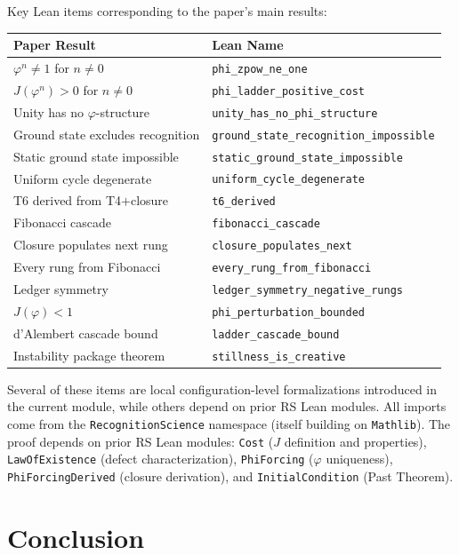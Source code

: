 \documentclass[11pt,a4paper]{article}
\newcommand{\Jcost}{J}
\newcommand{\phirs}{\varphi}
\begin{document}
Key Lean items corresponding to the paper's main results:
\begin{center}
\begin{tabular}{@{}ll@{}}
\toprule
\textbf{Paper Result} & \textbf{Lean Name} \\
\midrule
$\phirs^n\neq 1$ for $n\neq 0$ & \texttt{phi\_zpow\_ne\_one} \\
$\Jcost(\phirs^n)>0$ for $n\neq 0$ & \texttt{phi\_ladder\_positive\_cost} \\
Unity has no $\phirs$-structure & \texttt{unity\_has\_no\_phi\_structure} \\
Ground state excludes recognition & \texttt{ground\_state\_recognition\_impossible} \\
Static ground state impossible & \texttt{static\_ground\_state\_impossible} \\
Uniform cycle degenerate & \texttt{uniform\_cycle\_degenerate} \\
T6 derived from T4$+$closure & \texttt{t6\_derived} \\
Fibonacci cascade & \texttt{fibonacci\_cascade} \\
Closure populates next rung & \texttt{closure\_populates\_next} \\
Every rung from Fibonacci & \texttt{every\_rung\_from\_fibonacci} \\
Ledger symmetry & \texttt{ledger\_symmetry\_negative\_rungs} \\
$\Jcost(\phirs)<1$ & \texttt{phi\_perturbation\_bounded} \\
d'Alembert cascade bound & \texttt{ladder\_cascade\_bound} \\
Instability package theorem & \texttt{stillness\_is\_creative} \\
\bottomrule
\end{tabular}
\end{center}

Several of these items are local configuration-level formalizations introduced in the current module, while others depend on prior RS Lean modules.  All imports come from the \texttt{RecognitionScience} namespace (itself building on \texttt{Mathlib}).  The proof depends on prior RS Lean modules: \texttt{Cost} ($\Jcost$ definition and properties), \texttt{LawOfExistence} (defect characterization), \texttt{PhiForcing} ($\phirs$ uniqueness), \texttt{PhiForcingDerived} (closure derivation), and \texttt{InitialCondition} (Past Theorem).

\section{Conclusion}
\label{sec:conclusion}
\end{document}
